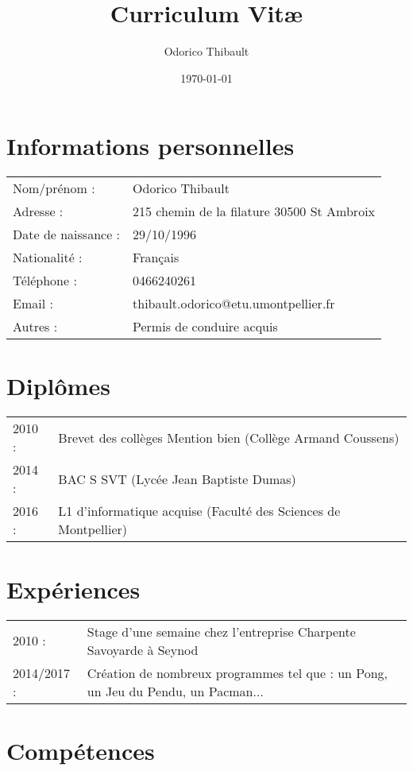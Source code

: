 \documentclass[a4papaer]{article}
\title{Curriculum Vit\ae}
\author{Odorico Thibault}
\date{\today}
\begin{document}
\maketitle

\section*{Informations personnelles}

\begin{tabular}{ll}
  Nom/prénom : & Odorico Thibault\\
  Adresse : & 215 chemin de la filature 30500 St Ambroix\\
  Date de naissance : & 29/10/1996\\
  Nationalité : & Français\\
  Téléphone : & 0466240261\\
  Email : & thibault.odorico@etu.umontpellier.fr\\
  Autres : & Permis de conduire acquis\\
\end{tabular}
    
\section*{Diplômes}

\begin{tabular}{ll}
  2010 : & Brevet des collèges Mention bien (Collège Armand Coussens)\\
  2014 : & BAC S SVT (Lycée Jean Baptiste Dumas)\\
  2016 : & L1 d'informatique acquise (Faculté des Sciences de Montpellier)\\
\end{tabular}

\section*{Expériences}

\begin{tabular}{ll}
  2010 : & Stage d'une semaine chez l'entreprise Charpente Savoyarde à
Seynod\\
  2014/2017 : & Création de nombreux programmes tel que : un Pong, un
Jeu du Pendu, un Pacman...\\
\end{tabular}

\section*{Compétences}
\end{document}

